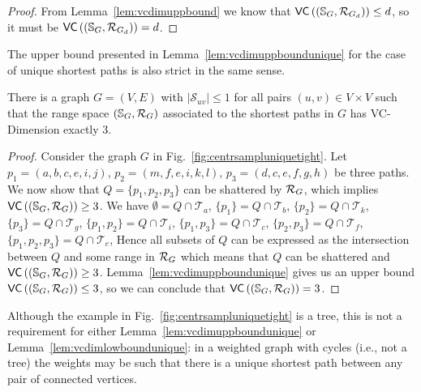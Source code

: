 \begin{proof}
  From Lemma~\ref{lem:vcdimuppbound} we know that
  $\mathsf{VC}\left((\mathbb{S}_G,\mathcal{R}_{G_d})\right)\le d$, so
  it must be $\mathsf{VC}\left((\mathbb{S}_G,\mathcal{R}_{G_d})\right)=d$.
\end{proof}

The upper bound presented in Lemma~\ref{lem:vcdimuppboundunique}  for the case
of unique shortest paths is also strict in the same sense.

\begin{lemma}\label{lem:vcdimlowboundunique}
  There is a graph $G=(V,E)$ with $|\mathcal{S}_{uv}|\le1$ for all
  pairs $(u,v)\in V\times V$ such that the range space $(\mathbb{S}_G,\mathcal{R}_G)$ associated to the
  shortest paths in $G$ has VC-Dimension exactly $3$.
\end{lemma}


\begin{proof}
  Consider the graph $G$ in Fig.~\ref{fig:centrsampluniquetight}.
  Let $p_1=(a,b,c,e,i,j)$, $p_2=(m,f,e,i,k,l)$, $p_3=(d,c,e,f,g,h)$ be three
  paths. We now show that $Q=\{p_1,p_2,p_3\}$ can be shattered by $\mathcal{R}_G$, which
  implies $\mathsf{VC}\left((\mathbb{S}_G,\mathcal{R}_G)\right)\ge 3$. We have $\emptyset=Q\cap\mathcal{T}_a$,
  $\{p_1\}=Q\cap\mathcal{T}_b$, $\{p_2\}=Q\cap\mathcal{T}_k$,
  $\{p_3\}=Q\cap\mathcal{T}_g$, $\{p_1,p_2\}=Q\cap\mathcal{T}_i$,
  $\{p_1,p_3\}=Q\cap\mathcal{T}_c$, $\{p_2,p_3\}=Q\cap\mathcal{T}_f$,
  $\{p_1,p_2,p_3\}=Q\cap\mathcal{T}_e$,  
  Hence all subsets of $Q$ can be expressed as the intersection between $Q$ and
  some range in $\mathcal{R}_G$ which means that $Q$ can be shattered and
  $\mathsf{VC}\left((\mathbb{S}_G,\mathcal{R}_G)\right)\ge 3$. Lemma~\ref{lem:vcdimuppboundunique} gives us an upper
  bound $\mathsf{VC}\left((\mathbb{S}_G,\mathcal{R}_G)\right)\le3$, so we can conclude that
  $\mathsf{VC}\left((\mathbb{S}_G,\mathcal{R}_G)\right)=3$.
\end{proof}

Although the example in Fig.~\ref{fig:centrsampluniquetight} is a tree, this is not a
requirement for either Lemma~\ref{lem:vcdimuppboundunique} or
Lemma~\ref{lem:vcdimlowboundunique}: in a weighted graph with cycles (i.e., not
a tree) the weights may be such that there is a unique shortest path between any
pair of connected vertices.

